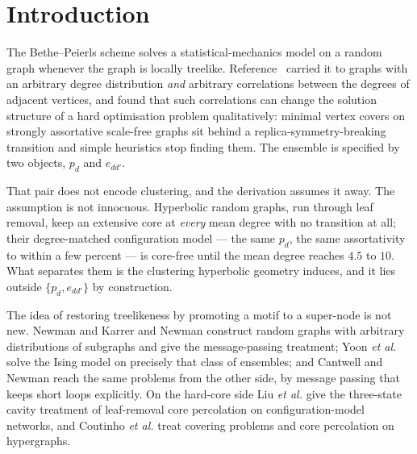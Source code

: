 \documentclass[aps,pre,twocolumn,superscriptaddress,floatfix]{revtex4-2}
\begin{document}
\maketitle

\section{Introduction}
\label{sec:intro}

The Bethe--Peierls scheme solves a statistical-mechanics model on a random graph
whenever the graph is locally treelike. Reference~\cite{VW03} carried it to
graphs with an arbitrary degree distribution \emph{and} arbitrary correlations
between the degrees of adjacent vertices, and found that such correlations can
change the solution structure of a hard optimisation problem qualitatively:
minimal vertex covers on strongly assortative scale-free graphs sit behind a
replica-symmetry-breaking transition and simple heuristics stop finding them.
The ensemble is specified by two objects, $p_d$ and $e_{dd'}$.

That pair does not encode clustering, and the derivation assumes it away. The
assumption is not innocuous. Hyperbolic random graphs, run through leaf removal,
keep an extensive core at \emph{every} mean degree with no transition at all;
their degree-matched configuration model --- the same $p_d$, the same
assortativity to within a few percent --- is core-free until the mean degree
reaches $4.5$ to $10$. What separates them is the clustering hyperbolic geometry
induces, and it lies outside $\{p_d,e_{dd'}\}$ by construction.

The idea of restoring treelikeness by promoting a motif to a super-node is not
new. Newman \cite{New09} and Karrer and Newman \cite{KN10} construct random
graphs with arbitrary distributions of subgraphs and give the message-passing
treatment; Yoon \textit{et al.} \cite{Yoon11} solve the Ising model on precisely
that class of ensembles; and Cantwell and Newman \cite{CN19} reach the same
problems from the other side, by message passing that keeps short loops
explicitly. On the hard-core side Liu \textit{et al.} \cite{Liu12} give the
three-state cavity treatment of leaf-removal core percolation on
configuration-model networks, and Coutinho \textit{et al.} \cite{Cou20} treat
covering problems and core percolation on hypergraphs.
\end{document}
